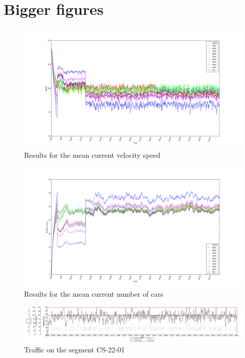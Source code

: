 \chapter{Bigger figures}

\begin{figure}[!ht]
  \centering
  \begin{adjustbox}{angle=90} 
  \includegraphics[scale=0.4]{images/Speed.png}
  \end{adjustbox}
  \caption{Results for the mean current velocity speed}
  \label{ap:vcurrent}
\end{figure}

\begin{figure}[!ht]
  \centering
  \begin{adjustbox}{angle=90} 
  \includegraphics[scale=0.4]{images/Num_cars.png}
  \end{adjustbox}
  \caption{Results for the mean current number of cars}
  \label{ap:numCars}
\end{figure}

\begin{figure}[!ht]
  \centering
  \begin{adjustbox}{angle=90} 
  \includegraphics[scale=0.3]{images/cs2201.png}
  \end{adjustbox}
  \caption{Traffic on the segment CS-22-01}
  \label{ap:traffic}
\end{figure}